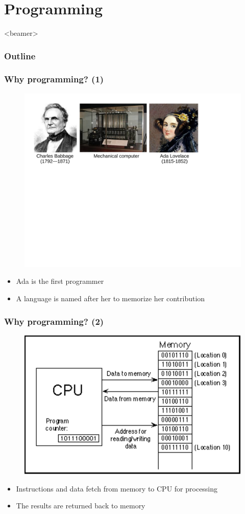 \section{Programming}
\label{sec:program}
\begin{frame}<beamer>
    \frametitle{Outline}
    \tableofcontents[currentsection]
\end{frame}

\begin{frame}
	\frametitle{Why programming? (1)}
	\begin{figure}
	\includegraphics[width=0.85\linewidth]{figs/ada.pdf}
\end{figure}
\begin{itemize}
	\item {Ada is the first programmer}
	\item {A language is named after her to memorize her contribution}
\end{itemize}
\end{frame}

\begin{frame}
	\frametitle{Why programming? (2)}
	\begin{figure}
	\includegraphics[width=0.65\linewidth]{figs/workflow.pdf}
\end{figure}
\begin{itemize}
	\item {Instructions and data fetch from memory to CPU for processing}
	\item {The results are returned back to memory}
\end{itemize}
\end{frame}

